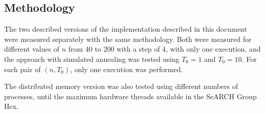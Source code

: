 \subsection{Methodology}
\label{sec:methodology}

The two described versions of the implementation described in this document were measured separately with the same methodology. Both were measured for different values of $n$ from 40 to 200 with a step of 4, with only one execution, and the approach with simulated annealing was tested using $T_{0}=1$ and $T_{0}=10$. For each pair of $(n,T_{0})$, only one execution was performed.

The distributed memory version was also tested using different numbers of processes, until the maximum hardware threads available in the SeARCH Group Hex.